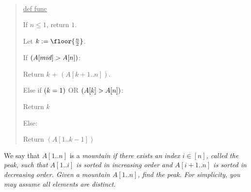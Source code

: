 \documentclass[10pt]{article}
\newcommand{\parof}[1]{\mleft( #1 \mright)}
\begin{document}
\begin{solution}\ %
\begin{quote}%
\noindent\ul{def func }%


\begin{steps}
  \item If \( n \leq 1 \), return \( 1 \).
  \item Let \( k := \floor{\frac{n}{2}} \).
  \item If \( \parof{A[mid] > A[n]} \):
  \begin{steps}
    \item Return \( k \) + \( (A[k+1..n]) \).
  \end{steps}
  \item Else if \( \parof{k = 1} \) OR \( \parof{A[k] > A[n] } \):
  \begin{steps}
    \item Return \( k \)
  \end{steps}
  \item Else:
  \begin{steps}
    \item Return \( (A[1..k-1]) \)
  \end{steps}
\end{steps}
\end{quote}
\end{solution}
\pagebreak

We say that \( A[1..n] \) is a \it{mountain} if there exists an index \( i \in [n] \), called the
\it{peak}, such that \( A[1..i] \) is sorted in increasing order and \( A[i + 1..n] \) is sorted in
decreasing order. Given a mountain \( A[1..n] \), find the peak. For simplicity, you may assume all
elements are distinct.
\end{document}
